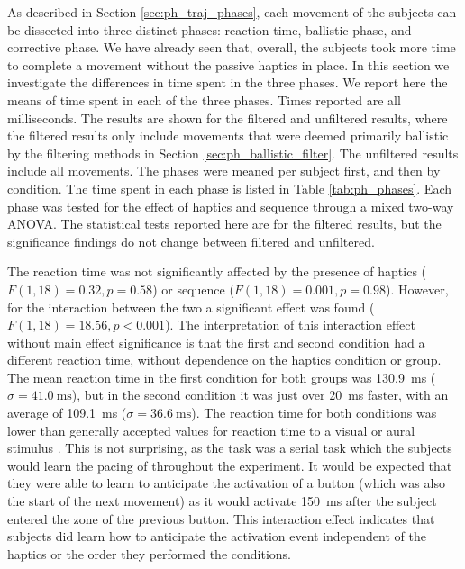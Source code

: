 As described in Section \ref{sec:ph_traj_phases}, each movement of the subjects can be dissected into three distinct phases: reaction time, ballistic phase, and corrective phase.
We have already seen that, overall, the subjects took more time to complete a movement without the passive haptics in place.
In this section we investigate the differences in time spent in the three phases.
We report here the means of time spent in each of the three phases.
Times reported are all milliseconds.
The results are shown for the filtered and unfiltered results, where the filtered results only include movements that were deemed primarily ballistic by the filtering methods in Section \ref{sec:ph_ballistic_filter}.
The unfiltered results include all movements.
The phases were meaned per subject first, and then by condition.
The time spent in each phase is listed in Table \ref{tab:ph_phases}.
Each phase was tested for the effect of haptics and sequence through a mixed two-way ANOVA.
The statistical tests reported here are for the filtered results, but the significance findings do not change between filtered and unfiltered.

The reaction time was not significantly affected by the presence of haptics ($F(1,18)=0.32, p=0.58$) or sequence ($F(1,18)=0.001, p=0.98$).
However, for the interaction between the two a significant effect was found ($F(1,18)=18.56, p<0.001$).
The interpretation of this interaction effect without main effect significance is that the first and second condition had a different reaction time, without dependence on the haptics condition or group.
The mean reaction time in the first condition for both groups was \SI{130.9}{\milli\second} ($\sigma=\SI{41.0}{\milli\second}$), but in the second condition it was just over \SI{20}{\milli\second} faster, with an average of \SI{109.1}{\milli\second} ($\sigma=\SI{36.6}{\milli\second}$).
The reaction time for both conditions was lower than generally accepted values for reaction time to a visual or aural stimulus \citep{teichner_recent_1954}.
This is not surprising, as the task was a serial task which the subjects would learn the pacing of throughout the experiment.
It would be expected that they were able to learn to anticipate the activation of a button (which was also the start of the next movement) as it would activate \SI{150}{\milli\second} after the subject entered the zone of the previous button.
This interaction effect indicates that subjects did learn how to anticipate the activation event independent of the haptics or the order they performed the conditions.


